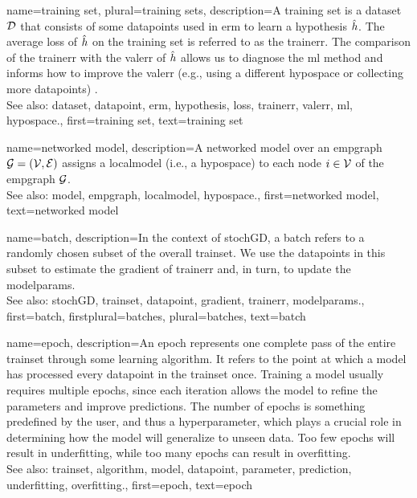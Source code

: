 {name={training set}, plural={training sets},
	description={A training set is a \gls{dataset} $\mathcal{D}$ that consists of some \glspl{datapoint} used in \gls{erm} 
		to learn a \gls{hypothesis} $\hat{h}$. The average \gls{loss} of $\hat{h}$ on the 
		training set is referred to as the \gls{trainerr}. The comparison of the \gls{trainerr} with the 
		\gls{valerr} of $\hat{h}$ allows us to diagnose the \gls{ml} method and informs how to improve 
		the \gls{valerr} (e.g., using a different \gls{hypospace} or collecting more \glspl{datapoint}) \cite[Sec. 6.6]{MLBasics}.
			\\
		See also: \gls{dataset}, \gls{datapoint}, \gls{erm}, \gls{hypothesis}, \gls{loss}, \gls{trainerr}, \gls{valerr}, \gls{ml}, \gls{hypospace}.},
	first={training set},
	text={training set}  
}

{name={networked model},
 	description={A networked \gls{model} over an \gls{empgraph} $\mathcal{G} = \left( \mathcal{V},\mathcal{E} \right)$ assigns 
   		a \gls{localmodel} (i.e., a \gls{hypospace}) to each node $i \in \mathcal{V}$ of the \gls{empgraph} $\mathcal{G}$.
   		\\
		See also: \gls{model}, \gls{empgraph}, \gls{localmodel}, \gls{hypospace}.}, 
   first={networked model},
   text={networked model}  
}

{name={batch},
	description={In the context of \gls{stochGD}, a batch refers to a randomly 
		chosen subset of the overall \gls{trainset}. We use the \glspl{datapoint} in this subset 
		to estimate the \gls{gradient} of \gls{trainerr} and, in turn, to update the \gls{modelparams}.
			\\
		See also: \gls{stochGD}, \gls{trainset}, \gls{datapoint}, \gls{gradient}, \gls{trainerr}, \gls{modelparams}.}, 
 	first={batch},
 	firstplural={batches}, 
 	plural={batches}, 
 	text={batch}  
}


{name={epoch},
	description={An epoch represents one complete pass of the entire \gls{trainset} through some learning 
		\gls{algorithm}. It refers to the point at which a \gls{model} has processed every \gls{datapoint} in the \gls{trainset} once. 
		Training a \gls{model} usually requires multiple epochs, since each iteration allows the \gls{model} to refine the 
		\glspl{parameter} and improve \glspl{prediction}. The number of epochs is something predefined by the user,  
		and thus a hyperparameter, which plays a crucial role in determining how the \gls{model} will generalize to unseen \gls{data}. 
		Too few epochs will result in \gls{underfitting}, while too many epochs can result in \gls{overfitting}.
		\\
		See also: \gls{trainset}, \gls{algorithm}, \gls{model}, \gls{datapoint}, \gls{parameter}, \gls{prediction}, \gls{underfitting}, \gls{overfitting}.},
	first={epoch},
	text={epoch}
} 


